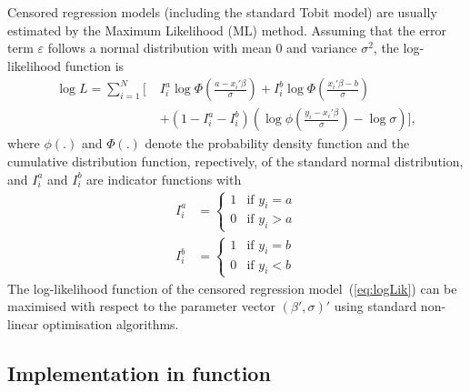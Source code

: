 \documentclass[article,nojss]{jss}
\newcommand{\dnorm}{\phi}%
\newcommand{\pnorm}{\Phi}%
\begin{document}
Censored regression models (including the standard Tobit model)
are usually estimated by the Maximum Likelihood (ML) method.
Assuming that the error term $\varepsilon$ follows a normal distribution
with mean $0$ and variance $\sigma^2$,
the log-likelihood function is
\begin{align}
\log L  = 
   \sum_{i = 1}^N \bigg[ \;&
      I_i^a \log \pnorm \left( \frac{ a - x_i ' \beta }{ \sigma } \right)
      + I_i^b \log \pnorm \left( \frac{ x_i ' \beta - b }{ \sigma } \right)
      \label{eq:logLik}\\
   & + \left( 1 - I_i^a - I_i^b \right)
      \left(
         \log \dnorm \left( \frac{ y_i - x_i ' \beta }{ \sigma } \right)
         - \log \sigma
      \right)
   \bigg], \nonumber
\end{align}
where $\dnorm(.)$ and  $\pnorm(.)$ denote the probability density function
and the cumulative distribution function, repectively,
of the standard normal distribution,
and $I_i^a$ and $I_i^b$ are indicator functions with
\begin{align}
I_i^a & =
   \begin{cases}
   1 & \text{if } y_i = a\\
   0 & \text{if } y_i > a
   \end{cases}\\
I_i^b & =
   \begin{cases}
   1 & \text{if } y_i = b\\
   0 & \text{if } y_i < b
   \end{cases}
\end{align}
The log-likelihood function of the censored regression model~(\ref{eq:logLik})
can be maximised with respect to the parameter vector $( \beta' , \sigma )'$
using standard non-linear optimisation algorithms.


\subsection[Implementation in function tobit]{Implementation in function }
\end{document}
